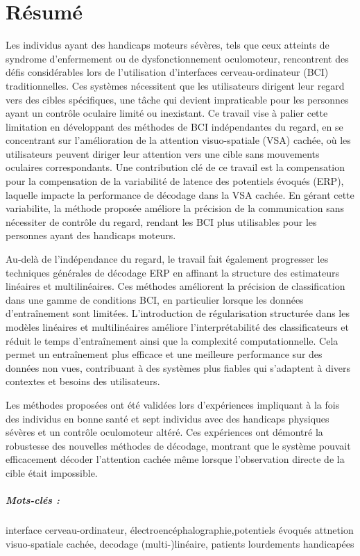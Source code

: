 \chapter*{R\'esum\'e}
Les individus ayant des handicaps moteurs sévères, tels que ceux atteints de
syndrome d'enfermement ou de dysfonctionnement oculomoteur, rencontrent des défis considérables
lors de l'utilisation d'interfaces cerveau-ordinateur (BCI)  traditionnelles.
Ces systèmes nécessitent que les utilisateurs dirigent leur regard vers des
cibles spécifiques, une tâche qui devient impraticable pour les personnes ayant un contrôle oculaire limité ou inexistant.
Ce travail vise \`a palier cette limitation en développant des méthodes de BCI
indépendantes du regard, en se concentrant sur l'amélioration de la attention visuo-spatiale (VSA)
cachée,
où les utilisateurs peuvent diriger leur attention vers une cible sans mouvements
oculaires correspondants.
Une contribution clé de ce travail est la compensation pour la compensation de
la variabilité de latence des potentiels évoqués (ERP), laquelle impacte
la performance de décodage dans la
VSA cachée.
En gérant cette variabilite, la méthode proposée améliore la précision de la communication
sans nécessiter de contrôle du regard, rendant les BCI plus utilisables pour les personnes ayant des handicaps moteurs.

Au-delà de l'indépendance du regard, le travail fait également progresser les
techniques générales de décodage ERP en affinant la structure des estimateurs
linéaires et multilinéaires.
Ces méthodes améliorent la précision de classification dans une gamme de
conditions BCI, en particulier lorsque les données d'entraînement sont limitées.
L'introduction de régularisation structurée dans les modèles linéaires et
multilinéaires améliore l'interprétabilité des classificateurs et réduit le temps d'entraînement ainsi que la complexité computationnelle.
Cela permet un entraînement plus efficace et une meilleure performance sur des données non vues, contribuant à des systèmes plus fiables qui s'adaptent à divers contextes et besoins des utilisateurs.

Les méthodes proposées ont été validées lors d'expériences impliquant à la fois
des individus en bonne santé et sept individus avec des handicaps physiques sévères et un contrôle oculomoteur altéré.
Ces expériences ont démontré la robustesse des nouvelles méthodes de décodage, montrant que le système pouvait efficacement décoder l'attention cachée même lorsque l'observation directe de la cible  était impossible.

\paragraph{Mots-clés :} interface cerveau-ordinateur, électroencéphalographie,potentiels évoqués
attnetion visuo-spatiale cachée, decodage (multi-)linéaire, patients lourdements handicapées
